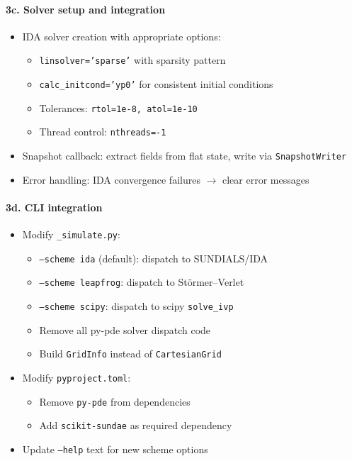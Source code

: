 \paragraph{3c. Solver setup and integration}
\label{par:solver-setup}

\begin{itemize}
  \item[$\square$] IDA solver creation with appropriate options:
  \begin{itemize}
    \item \texttt{linsolver='sparse'} with sparsity pattern
    \item \texttt{calc\_initcond='yp0'} for consistent initial conditions
    \item Tolerances: \texttt{rtol=1e-8, atol=1e-10}
    \item Thread control: \texttt{nthreads=-1}
  \end{itemize}
  \item[$\square$] Snapshot callback: extract fields from flat state, write via \texttt{SnapshotWriter}
  \item[$\square$] Error handling: IDA convergence failures $\to$ clear error messages
\end{itemize}

\paragraph{3d. CLI integration}
\label{par:cli-integration}

\begin{itemize}
  \item[$\square$] Modify \texttt{\_simulate.py}:
  \begin{itemize}
    \item \texttt{--scheme ida} (default): dispatch to SUNDIALS/IDA
    \item \texttt{--scheme leapfrog}: dispatch to St\"ormer--Verlet
    \item \texttt{--scheme scipy}: dispatch to scipy \texttt{solve\_ivp}
    \item Remove all py-pde solver dispatch code
    \item Build \texttt{GridInfo} instead of \texttt{CartesianGrid}
  \end{itemize}
  \item[$\square$] Modify \texttt{pyproject.toml}:
  \begin{itemize}
    \item Remove \texttt{py-pde} from dependencies
    \item Add \texttt{scikit-sundae} as required dependency
  \end{itemize}
  \item[$\square$] Update \texttt{--help} text for new scheme options
\end{itemize}

